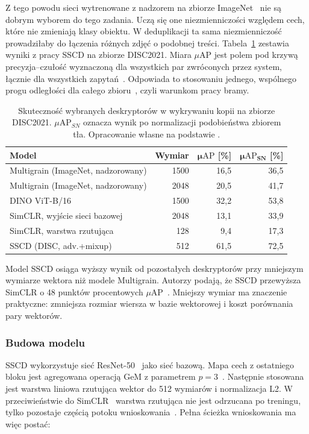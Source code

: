 Z tego powodu sieci wytrenowane z nadzorem na zbiorze
ImageNet~\cite{deng2009imagenet} nie są dobrym wyborem do tego zadania.
Uczą się one niezmienniczości względem cech, które nie zmieniają klasy
obiektu. W deduplikacji ta sama niezmienniczość prowadziłaby do
łączenia różnych zdjęć o podobnej treści. Tabela~\ref{tab:sscd-uap}
zestawia wyniki z pracy SSCD na zbiorze DISC2021.
Miara \(\mu\mathrm{AP}\) jest polem pod krzywą precyzja--czułość
wyznaczoną dla wszystkich par zwróconych przez system, łącznie
dla wszystkich zapytań~\cite{douze2021disc}. Odpowiada to stosowaniu
jednego, wspólnego progu odległości dla całego
zbioru~\cite{pizzi2022sscd}, czyli warunkom pracy bramy.

\begin{table}[!htbp]
\centering
\caption{Skuteczność wybranych deskryptorów w wykrywaniu kopii na
zbiorze DISC2021. \(\mu\mathrm{AP}_{SN}\) oznacza wynik po normalizacji
podobieństwa zbiorem tła. Opracowanie własne na podstawie
\cite{pizzi2022sscd}.}
\label{tab:sscd-uap}
\begin{tabular}{|l|r|r|r|}
\hline
\textbf{Model} & \textbf{Wymiar} & \(\boldsymbol{\mu\mathrm{AP}}\) [\%]
& \(\boldsymbol{\mu\mathrm{AP}_{SN}}\) [\%] \\
\hline
Multigrain (ImageNet, nadzorowany) & 1500 & 16,5 & 36,5 \\
Multigrain (ImageNet, nadzorowany) & 2048 & 20,5 & 41,7 \\
DINO ViT-B/16 & 1500 & 32,2 & 53,8 \\
SimCLR, wyjście sieci bazowej & 2048 & 13,1 & 33,9 \\
SimCLR, warstwa rzutująca & 128 & 9,4 & 17,3 \\
SSCD (DISC, adv.+mixup) & 512 & 61,5 & 72,5 \\
\hline
\end{tabular}
\end{table}

Model SSCD osiąga wyższy wynik od pozostałych deskryptorów przy
mniejszym wymiarze wektora niż modele Multigrain. Autorzy podają, że
SSCD przewyższa SimCLR o 48 punktów procentowych
\(\mu\mathrm{AP}\)~\cite{pizzi2022sscd}. Mniejszy wymiar ma znaczenie
praktyczne: zmniejsza rozmiar wiersza w bazie wektorowej i koszt
porównania pary wektorów.

\subsubsection{Budowa modelu}

SSCD wykorzystuje sieć ResNet-50~\cite{he2016resnet} jako sieć bazową.
Mapa cech z ostatniego bloku jest agregowana operacją GeM z
parametrem \(p=3\)~\cite{radenovic2018gem,pizzi2022sscd}. Następnie
stosowana jest warstwa liniowa rzutująca wektor do 512 wymiarów
i normalizacja L2. W przeciwieństwie do SimCLR~\cite{chen2020simclr}
warstwa rzutująca nie jest odrzucana po treningu, tylko pozostaje
częścią potoku wnioskowania~\cite{pizzi2022sscd}. Pełna ścieżka
wnioskowania ma więc postać:

